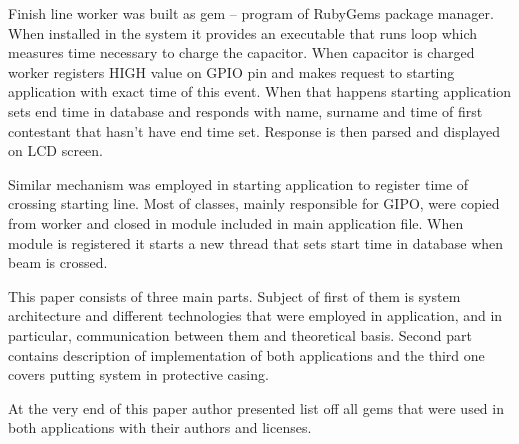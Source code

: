 \documentclass[11pt,a4paper, twoside]{article}
\begin{document}
	Finish line worker was built as gem – program of RubyGems package manager. When installed in the system it provides an executable that runs  loop which measures time necessary to charge the capacitor. When capacitor is charged worker registers HIGH value on GPIO pin and makes request to starting application with exact time of this event. When that happens starting application sets end time in database and responds with name, surname and time of first contestant that hasn't have end time set. Response is then parsed and displayed on  LCD  screen.
	
	Similar mechanism was employed in starting application to register time of crossing starting line. Most of classes, mainly responsible for GIPO, were copied from worker and closed in module included in main application file. When module is registered it starts a new thread that sets start time in database when beam  is crossed.
	
	This paper consists of three main parts. Subject of first of them is system architecture and different technologies that were employed in application, and in particular, communication between them and theoretical basis. Second part contains description of implementation of both applications and the third one covers putting system in protective casing.
	
	At the very end of this paper author presented list off all gems that were used in both applications with their authors and licenses.
\end{document}
